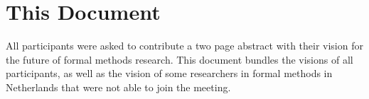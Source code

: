 \documentclass[sigplan,10pt,review,svgnames]{acmart}\settopmatter{printfolios=true,printccs=false,printacmref=false}
\begin{document}
\section{This Document}
All participants
were asked to contribute a two page abstract with their vision for the
future of formal methods research. This document bundles the visions
of all participants, as well as the vision of some researchers in
formal methods in Netherlands that were not able to join the meeting. 
\end{document}
